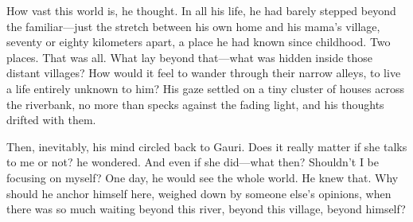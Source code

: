 How vast this world is, he thought. In all his life, he had barely stepped beyond the familiar—just the stretch between his own home and his mama's village, seventy or eighty kilometers apart, a place he had known since childhood. Two places. That was all. What lay beyond that—what was hidden inside those distant villages? How would it feel to wander through their narrow alleys, to live a life entirely unknown to him? His gaze settled on a tiny cluster of houses across the riverbank, no more than specks against the fading light, and his thoughts drifted with them.

Then, inevitably, his mind circled back to Gauri. Does it really matter if she talks to me or not? he wondered. And even if she did—what then? Shouldn't I be focusing on myself? One day, he would see the whole world. He knew that. Why should he anchor himself here, weighed down by someone else's opinions, when there was so much waiting beyond this river, beyond this village, beyond himself?